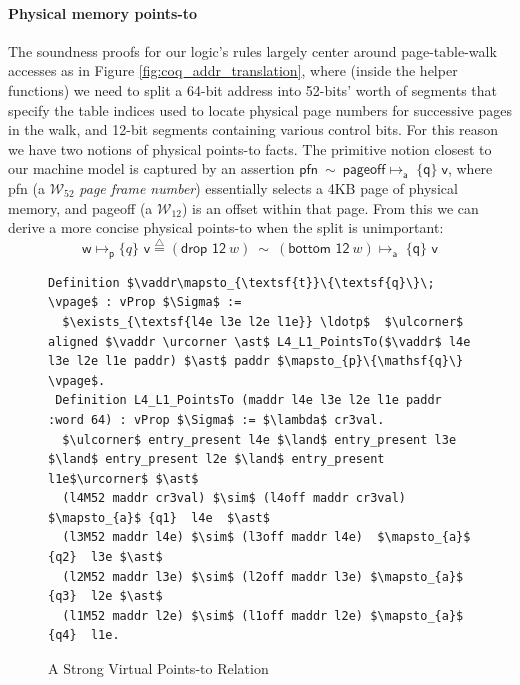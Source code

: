 \paragraph{Physical memory  points-to} The soundness proofs for our logic's rules largely center around page-table-walk accesses as in Figure \ref{fig:coq_addr_translation},
 where (inside the helper functions) we need to split a 64-bit address into 52-bits' worth of segments
that specify the table indices used to locate physical page numbers for successive pages in the walk, and 12-bit segments containing various control bits.
For this reason we have two notions of physical points-to facts. The primitive notion closest to our machine model is captured by an assertion
$ \textsf{pfn} \ \sim \ \textsf{pageoff} \mapsto_{\textsf{a}} \; \{\textsf{q}\} \; \textsf{v} $, where \textsf{pfn} (a $\mathcal{W}_{52}$ \emph{page frame number}) essentially selects a 4KB page of physical memory,
and \textsf{pageoff} (a $\mathcal{W}_{12}$) is an offset within that page.
From this we can derive a more concise physical points-to when the split is unimportant:
\[\textsf{w} \mapsto_{\textsf{p}} \{q\} \textsf{ v} \stackrel{\triangle}{=} (\textsf{drop 12}~w) \ \sim \ (\textsf{bottom 12}~w)\mapsto_{\textsf{a}} \; \{\textsf{q}\} \textsf{ v} \]

\begin{figure}
  \begin{lstlisting}[language=Coq]
 Definition $\vaddr\mapsto_{\textsf{t}}\{\textsf{q}\}\; \vpage$ : vProp $\Sigma$ := 
  $\exists_{\textsf{l4e l3e l2e l1e}} \ldotp$  $\ulcorner$ aligned $\vaddr \urcorner \ast$ L4_L1_PointsTo($\vaddr$ l4e l3e l2e l1e paddr) $\ast$ paddr $\mapsto_{p}\{\mathsf{q}\} \vpage$.
 Definition L4_L1_PointsTo (maddr l4e l3e l2e l1e paddr :word 64) : vProp $\Sigma$ := $\lambda$ cr3val.
  $\ulcorner$ entry_present l4e $\land$ entry_present l3e $\land$ entry_present l2e $\land$ entry_present l1e$\urcorner$ $\ast$
  (l4M52 maddr cr3val) $\sim$ (l4off maddr cr3val) $\mapsto_{a}$ {q1}  l4e  $\ast$
  (l3M52 maddr l4e) $\sim$ (l3off maddr l4e)  $\mapsto_{a}$ {q2}  l3e $\ast$ 
  (l2M52 maddr l3e) $\sim$ (l2off maddr l3e) $\mapsto_{a}$ {q3}  l2e $\ast$
  (l1M52 maddr l2e) $\sim$ (l1off maddr l2e) $\mapsto_{a}$ {q4}  l1e.
\end{lstlisting}
\vspace{-1em}
\caption{A Strong Virtual Points-to Relation}
  \label{fig:strongvirtualpointsto}
\end{figure}



